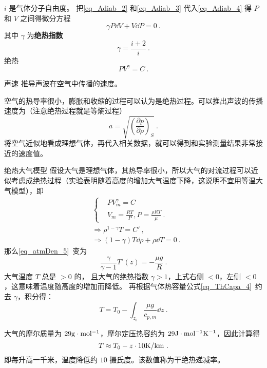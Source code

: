 $i$ 是气体分子自由度。 把\autoref{eq_Adiab_2} 和\autoref{eq_Adiab_3} 代入\autoref{eq_Adiab_4} 得 $P$ 和 $V$ 之间得微分方程
\begin{equation}
\gamma P\dd{V} + V \dd{P} = 0~.
\end{equation}
其中 $\gamma$ 为\textbf{绝热指数}
\begin{equation}
\gamma = \frac{i+2}{i}~.
\end{equation}
绝热
\begin{equation}
P V^\gamma = C~.
\end{equation}


\begin{example}{声速}
推导声波在空气中传播的速度。

空气的热导率很小，膨胀和收缩的过程可以认为是绝热过程。可以推出声波的传播速度为（注意绝热过程就是等熵过程）
\begin{equation}
a=\sqrt{\left(\frac{\partial p}{\partial \rho}\right)_S}~.
\end{equation}
将空气近似地看成理想气体，再代入相关数据，就可以得到和实验测量结果非常接近的速度值。
\end{example}
\begin{example}{绝热大气模型}
假设大气是理想气体，其热导率很小，所以大气的对流过程可以近似考虑成绝热过程（实验表明随着高度的增加大气温度下降，这说明不宜用等温大气模型），即
\begin{equation}
\begin{aligned}
&\begin{cases}
&PV_m^\gamma=C\\
&V_m=\frac{RT}{P},P=\frac{\rho R T}{\mu}~.
\end{cases}
\\
&\Rightarrow \rho^{1-\gamma}T=C'~,\\
&\Rightarrow (1-\gamma)T\dd \rho+\rho\dd T=0~.
\end{aligned}
\end{equation}
那么\autoref{eq_atmDen_5}~变为
\begin{equation}
\frac{\gamma}{\gamma-1}T'(z)=-\frac{\mu g}{R}~.
\end{equation}
大气温度 $T$ 总是 $>0$ 的， 且大气的绝热指数 $\gamma>1$，上式右侧 $<0$，左侧 $<0$，这意味着温度随高度的增加而降低。 再根据气体热容量公式\autoref{eq_ThCapa_4}~约去 $\gamma$，积分得：
\begin{equation}\label{eq_Adiab_6}
T=T_0-\int_{z_0}\frac{\mu g}{c_{p,m}} \dd z ~.
\end{equation}


大气的摩尔质量为 $29 \rm{g\cdot mol^{-1}}$，摩尔定压热容约为 $29 \rm{J\cdot mol^{-1}K^{-1}}$，因此计算得
\begin{equation}
T\approx T_0-z\cdot 10 \rm{K/km}~.
\end{equation}
即每升高一千米，温度降低约 $10$ 摄氏度。该数值称为干绝热递减率。
\end{example}

